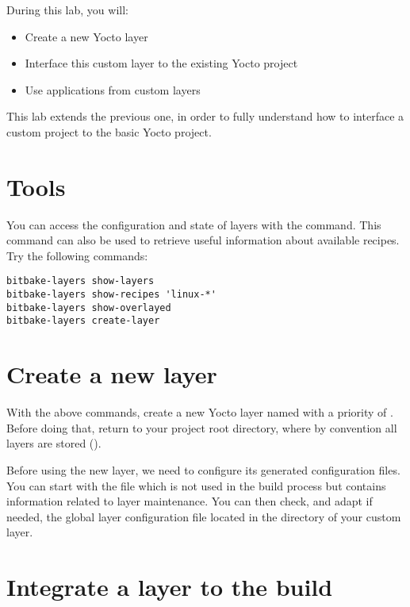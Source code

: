
During this lab, you will:
\begin{itemize}
  \item Create a new Yocto layer
  \item Interface this custom layer to the existing Yocto project
  \item Use applications from custom layers
\end{itemize}

This lab extends the previous one, in order to fully understand how to interface
a custom project to the basic Yocto project.

\section{Tools}

You can access the configuration and state of layers with the
 command. This command can also be used to retrieve useful
information about available recipes. Try the following commands:
\begin{verbatim}
bitbake-layers show-layers
bitbake-layers show-recipes 'linux-*'
bitbake-layers show-overlayed
bitbake-layers create-layer
\end{verbatim}

\section{Create a new layer}

With the above commands, create a new Yocto layer named
 with a priority of . Before doing that,
return to your project root directory, where by convention all layers are
stored ().

Before using the new layer, we need to configure its generated configuration
files. You can start with the  file which is not used in the build
process but contains information related to layer maintenance. You can then
check, and adapt if needed, the global layer configuration file located in the
 directory of your custom layer.

\section{Integrate a layer to the build}

